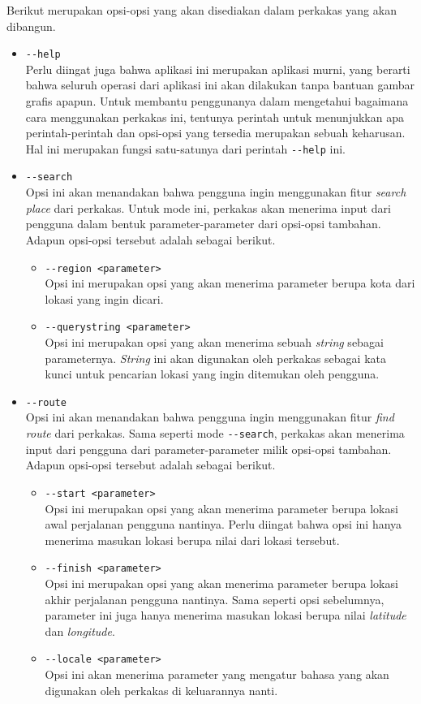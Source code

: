 \documentclass[a4paper,twoside]{article}
\begin{document}
\begin{enumerate}
Berikut merupakan opsi-opsi yang akan disediakan dalam perkakas yang akan dibangun.

\begin{itemize}
	\item \verb|--help|\\
	Perlu diingat juga bahwa aplikasi ini merupakan aplikasi \cl murni, yang berarti bahwa seluruh operasi dari aplikasi ini akan dilakukan tanpa bantuan gambar grafis apapun. Untuk membantu penggunanya dalam mengetahui bagaimana cara menggunakan perkakas ini, tentunya perintah untuk menunjukkan apa perintah-perintah dan opsi-opsi yang tersedia merupakan sebuah keharusan. Hal ini merupakan fungsi satu-satunya dari perintah \verb|--help| ini.
	\item \verb|--search|\\
	Opsi ini akan menandakan bahwa pengguna ingin menggunakan fitur \textit{search place} dari perkakas. Untuk mode ini, perkakas akan menerima input dari pengguna dalam bentuk parameter-parameter dari opsi-opsi tambahan. Adapun opsi-opsi tersebut adalah sebagai berikut.
	
	\begin{itemize}
		\item \verb|--region <parameter>|\\
		Opsi ini merupakan opsi yang akan menerima parameter berupa kota dari lokasi yang ingin dicari.
		\item \verb|--querystring <parameter>|\\
		Opsi ini merupakan opsi yang akan menerima sebuah \textit{string} sebagai parameternya. \textit{String} ini akan digunakan oleh perkakas sebagai kata kunci untuk pencarian lokasi yang ingin ditemukan oleh pengguna.
	\end{itemize}
	
	\item \verb|--route|\\
	Opsi ini akan menandakan bahwa pengguna ingin menggunakan fitur \textit{find route} dari perkakas. Sama seperti mode \verb|--search|, perkakas akan menerima input dari pengguna dari parameter-parameter milik opsi-opsi tambahan. Adapun opsi-opsi tersebut adalah sebagai berikut.
	
	\begin{itemize}
		\item \verb|--start <parameter>|\\
		Opsi ini merupakan opsi yang akan menerima parameter berupa lokasi awal perjalanan pengguna nantinya. Perlu diingat bahwa opsi ini hanya menerima masukan lokasi berupa nilai \latlon dari lokasi tersebut.
		\item \verb|--finish <parameter>|\\
		Opsi ini merupakan opsi yang akan menerima parameter berupa lokasi akhir perjalanan pengguna nantinya. Sama seperti opsi sebelumnya, parameter ini juga hanya menerima masukan lokasi berupa nilai \textit{latitude} dan \textit{longitude}.
		\item \verb|--locale <parameter>|\\
		Opsi ini akan menerima parameter yang mengatur bahasa yang akan digunakan oleh perkakas di keluarannya nanti.
	\end{itemize}
	

\end{itemize}
\end{enumerate}
\end{document}
